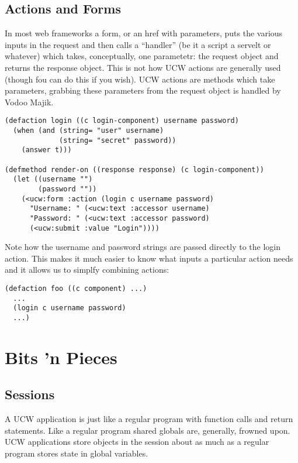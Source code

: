 \documentclass[a4paper]{article}
\newcommand{\ucw}{\textsc{UCW}}
\begin{document}
\subsection{Actions and Forms}

In most web frameworks a form, or an href with parameters, puts the
various inputs in the request and then calls a ``handler'' (be it a
script a servelt or whatever) which takes, conceptually, one
parametetr: the request object and returns the response object. This
is not how \ucw{} actions are generally used (though fou can do this
if you wish). \ucw{} actions are methods which take parameters,
grabbing these parameters from the request object is handled by Vodoo
Majik.

\begin{verbatim}
(defaction login ((c login-component) username password)
  (when (and (string= "user" username)
             (string= "secret" password))
    (answer t)))

(defmethod render-on ((response response) (c login-component))
  (let ((username "")
        (password ""))
    (<ucw:form :action (login c username password)
      "Username: " (<ucw:text :accessor username)
      "Password: " (<ucw:text :accessor password)
      (<ucw:submit :value "Login"))))
\end{verbatim}

Note how the username and password strings are passed directly to the
login action. This makes it much easier to know what inputs a
particular action needs and it allows us to simplfy combining actions:

\begin{verbatim}
(defaction foo ((c component) ...)
  ...
  (login c username password)
  ...)
\end{verbatim}


\section{Bits 'n Pieces}

\subsection{Sessions}

A \ucw{} application is just like a regular program with function
calls and return statements. Like a regular program shared globals
are, generally, frowned upon. \ucw{} applications store objects in the
session about as much as a regular program stores state in global
variables.
\end{document}

